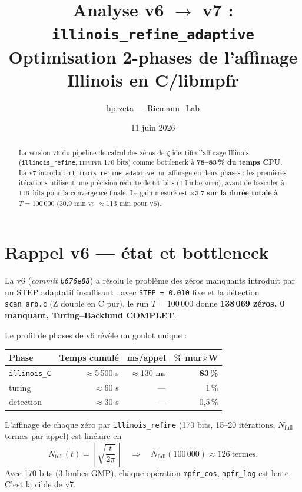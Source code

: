 \documentclass[11pt,a4paper]{article}
\title{\textbf{Analyse v6 $\to$ v7 : \texttt{illinois\_refine\_adaptive}}\\[4pt]
  \large Optimisation 2-phases de l'affinage Illinois en C/libmpfr}
\author{hprzeta --- Riemann\_Lab}
\date{11 juin 2026}
\begin{document}
\maketitle

\begin{abstract}
\noindent
La version v6 du pipeline de calcul des zéros de $\zeta$ identifie l'affinage
Illinois (\texttt{illinois\_refine}, \textsc{libmpfr} 170 bits) comme bottleneck à
\textbf{78--83\,\% du temps CPU}.
La v7 introduit \texttt{illinois\_refine\_adaptive}, un affinage en deux phases :
les premières itérations utilisent une précision réduite de 64~bits (1 limbe \textsc{mpfr}),
avant de basculer à 116~bits pour la convergence finale.
Le gain mesuré est \textbf{$\times 3.7$ sur la durée totale} à $T = 100\,000$
(30,9 min vs $\approx$113 min pour v6).
\end{abstract}

\section{Rappel v6 --- état et bottleneck}

La v6 (\textit{commit \texttt{b676e88}}) a résolu le problème des zéros manquants
introduit par un STEP adaptatif insuffisant : avec \texttt{STEP = 0.010} fixe et la
détection \texttt{scan\_arb.c} (Z double en C pur), le run $T = 100\,000$ donne
\textbf{138\,069 zéros, 0 manquant, Turing--Backlund COMPLET}.

Le profil de phases de v6 révèle un goulot unique :

\begin{center}
\begin{tabular}{lrrr}
\toprule
Phase & Temps cumulé & ms/appel & \% mur$\times$W \\
\midrule
\texttt{illinois\_C} & $\approx$5\,500 s & $\approx$130 ms & \textbf{83\,\%} \\
turing & $\approx$60 s & --- & 1\,\% \\
detection & $\approx$30 s & --- & 0,5\,\% \\
\bottomrule
\end{tabular}
\end{center}

L'affinage de chaque zéro par \texttt{illinois\_refine} (170 bits, 15--20 itérations,
$N_\text{full}$ termes par appel) est linéaire en
\begin{equation}
  N_\text{full}(t) = \left\lfloor\sqrt{\frac{t}{2\pi}}\right\rfloor
  \quad\Longrightarrow\quad
  N_\text{full}(100\,000) \approx 126\ \text{termes.}
\end{equation}
Avec 170 bits (3 limbes GMP), chaque opération \texttt{mpfr\_cos}, \texttt{mpfr\_log}
est lente. C'est la cible de v7.
\end{document}
